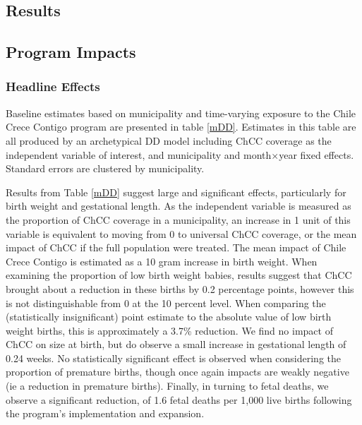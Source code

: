 \documentclass[12pt]{article}
\begin{document}
\begin{spacing}{1.4}
\section{Results}
\subsection{Program Impacts}
\subsubsection{Headline Effects}
\label{scn:headline}
Baseline estimates based on municipality and time-varying exposure
to the Chile Crece Contigo program are presented in table \ref{mDD}.
Estimates in this table are all produced by an archetypical DD model
including ChCC coverage as the independent variable of interest, and
municipality and month$\times$year fixed effects.  Standard errors
are clustered by municipality.

Results from Table \ref{mDD} suggest large and significant effects,
particularly for birth weight and gestational length.  As the
independent variable is measured as the proportion of ChCC coverage
in a municipality, an increase in 1 unit of this variable is equivalent
to moving from 0 to universal ChCC coverage, or the mean impact of
ChCC if the full population were treated. The mean impact of Chile
Crece Contigo is estimated as a 10 gram increase in birth weight.  When
examining the proportion of low birth weight babies, results suggest
that ChCC brought about a reduction in these births by 0.2 percentage
points, however this is not distinguishable from 0 at the 10 percent
level.  When comparing the (statistically insignificant) point estimate
to the absolute value of low
birth weight births, this is approximately a 3.7\% reduction. We find no
impact of ChCC on size at birth, but do observe a small increase in
gestational length of 0.24 weeks. No statistically significant effect
is observed when considering the proportion of premature births, though
once again impacts are weakly negative (ie a reduction in premature
births).  Finally, in turning to fetal deaths, we observe a significant
reduction, of 1.6 fetal deaths per 1,000 live births following the
program's implementation and expansion.




\end{spacing}
\end{document}
